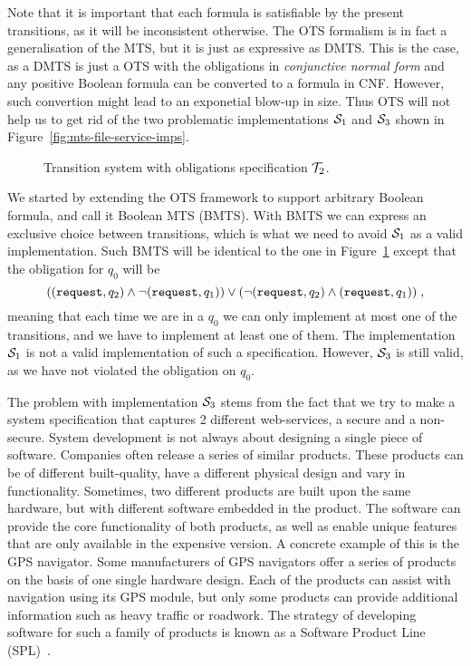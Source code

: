 Note that it is important that each formula is satisfiable by the present transitions, as it will be inconsistent otherwise. 
The OTS formalism is in fact a generalisation of the MTS, but it is just as expressive as DMTS. This is the case, as a DMTS is just a OTS with the obligations in \emph{conjunctive normal form} and any positive Boolean formula can be converted to a formula in CNF. However, such convertion might lead to an exponetial blow-up in size. Thus OTS will not help us to get rid of the two problematic implementations $\S_1$ and $\S_3$ shown in Figure~\ref{fig:mts-file-service-imps}. 
 

\begin{figure}[ht]           
\centering
    
    \caption{Transition system with obligations specification $\T_2$.}
    \label{fig:ots-file-service}
\end{figure}

We started by extending the OTS framework to support arbitrary Boolean formula, and call it Boolean MTS (BMTS). With BMTS we can express an exclusive choice between transitions, which is what we need to avoid $\S_1$ as a valid implementation.
Such BMTS will be identical to the one in Figure~\ref{fig:ots-file-service} except that the obligation for $q_0$ will be 
\[
    ((\transition{request},q_2) \wedge \neg (\transition{request},q_1)) \vee (\neg(\transition{request},q_2) \wedge (\transition{request},q_1))\;,
\] 
meaning that each time we are in a $q_0$ we can only implement at most one of the  transitions, and we have to implement at least one of them. The implementation $\S_1$ is not a valid implementation of such a specification. However, $\S_3$ is still valid, as we have not violated the obligation on $q_0$.

%     

The problem with implementation $\S_3$ stems from the fact that we try to make a system specification that captures 2 different web-services, a secure and a non-secure. System development is not always about designing a single piece of software. Companies often release a series of similar products. These products can be of different built-quality, have a different physical design and vary in functionality. Sometimes, two different products are built upon the same hardware, but with different software embedded in the product. The software can provide the core functionality of both products, as well as enable unique features that are only available in the expensive version. A concrete example of this is the  GPS navigator. Some manufacturers of GPS navigators offer a series of products on the basis of one single hardware design. Each of the products can assist with navigation using its GPS module, but only some products can provide additional information such as heavy traffic or roadwork. The strategy of developing software for such a family of products is known as a Software Product Line (SPL)~\cite{2001:SPL:501065}.

